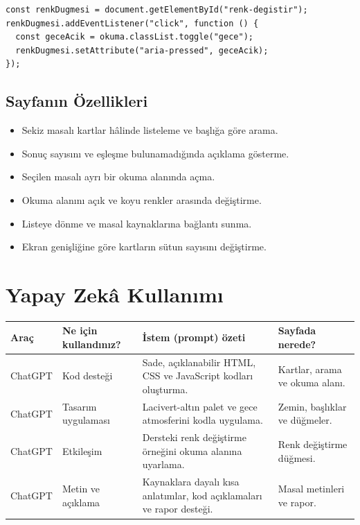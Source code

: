 \documentclass[12pt,a4paper]{article}
\begin{document}
\begin{lstlisting}[caption={İçsel JavaScript'ten önemli bir bölüm}]
const renkDugmesi = document.getElementById("renk-degistir");
renkDugmesi.addEventListener("click", function () {
  const geceAcik = okuma.classList.toggle("gece");
  renkDugmesi.setAttribute("aria-pressed", geceAcik);
});
\end{lstlisting}

\subsection{Sayfanın Özellikleri}
\begin{itemize}
\item Sekiz masalı kartlar hâlinde listeleme ve başlığa göre arama.
\item Sonuç sayısını ve eşleşme bulunamadığında açıklama gösterme.
\item Seçilen masalı ayrı bir okuma alanında açma.
\item Okuma alanını açık ve koyu renkler arasında değiştirme.
\item Listeye dönme ve masal kaynaklarına bağlantı sunma.
\item Ekran genişliğine göre kartların sütun sayısını değiştirme.
\end{itemize}


\section{Yapay Zekâ Kullanımı}


\begin{longtable}{@{}p{2.6cm}p{3.6cm}p{4.2cm}p{3.4cm}@{}}
\toprule
\textbf{Araç} & \textbf{Ne için kullandınız?} & \textbf{İstem (prompt) özeti} & \textbf{Sayfada nerede?} \\
\midrule
\endhead
ChatGPT & Kod desteği & Sade, açıklanabilir HTML, CSS ve JavaScript kodları oluşturma. & Kartlar, arama ve okuma alanı. \\[5pt]
ChatGPT & Tasarım uygulaması & Lacivert-altın palet ve gece atmosferini kodla uygulama. & Zemin, başlıklar ve düğmeler. \\[5pt]
ChatGPT & Etkileşim & Dersteki renk değiştirme örneğini okuma alanına uyarlama. & Renk değiştirme düğmesi. \\[5pt]
ChatGPT & Metin ve açıklama & Kaynaklara dayalı kısa anlatımlar, kod açıklamaları ve rapor desteği. & Masal metinleri ve rapor. \\
\bottomrule
\end{longtable}
\end{document}
